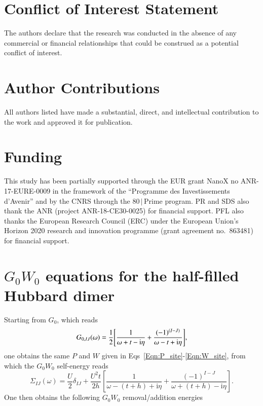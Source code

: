 \documentclass[aps,prb,reprint,superscriptaddress]{revtex4-1}
\newcommand{\I}{\text{i}}
\begin{document}
\section*{Conflict of Interest Statement}

The authors declare that the research was conducted in the absence of any commercial or financial relationships that could be construed as a potential conflict of interest.

\section*{Author Contributions}
All authors listed have made a substantial, direct, and intellectual contribution to the work and approved it for publication.

\section*{Funding}
This study has been partially supported through the EUR grant NanoX no ANR-17-EURE-0009 in the framework of the ``Programme des Investissements d'Avenir'' and by the CNRS through the 80$\,|\,$Prime program. PR and SDS also thank the ANR (project ANR-18-CE30-0025) for financial support.
PFL also thanks the European Research Council (ERC) under the European Union's Horizon 2020 research and innovation programme (grant agreement no.~863481) for financial support. 




\appendix

\section{$G_0W_0$ equations for the half-filled Hubbard dimer}
\label{app:G0W0}
Starting from $G_0$, which reads
\begin{equation}
G_{0,IJ}(\omega)=\frac{1}{2}\qty[\frac{1}{\omega+t-\I\eta}+ \frac{(-1)^{(I-J)}}{\omega-t+\I\eta} ],
\label{Eqn:G_0-2e}
\end{equation}
one obtains the same $P$ and $W$ given in Eqs~\eqref{Eqn:P_site}-\eqref{Eqn:W_site}, from which the $G_0W_0$ self-energy reads
\begin{equation}
\label{Eqn:Sig_G0W0}
    \Sigma_{IJ}(\omega) =\frac{U}{2}\delta_{IJ}+\frac{U^2t}{2h}
    \left[ \frac{1}{\omega-(t+h)+\I\eta}  +\frac{(-1)^{I-J}}{\omega+(t+h)-\I\eta}\right].
\end{equation}
One then obtains the following $G_0W_0$ removal/addition energies 
\end{document}
